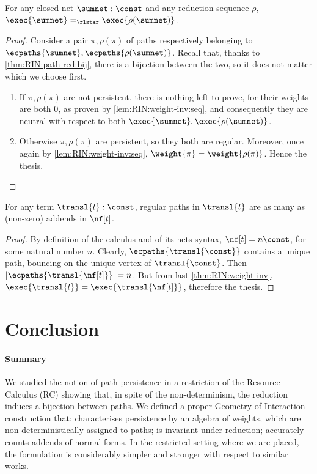 \begin{theorem}
\label{thm:RIN:weight-inv}
For any closed net $\sumnet: \const$ and any reduction sequence
$\rho$, $\exec{\sumnet} =_\rlstar \exec{\rho(\sumnet)}$.
\end{theorem}

\begin{proof}
  Consider a pair $\pi,\rho(\pi)$ of paths respectively belonging to 
  $\ecpaths{\sumnet}, \ecpaths{\rho(\sumnet)}$.
  Recall that, thanks to \autoref{thm:RIN:path-red:bij},
  there is a bijection between the two, so it does not matter which we choose 
  first.
  \begin{enumerate}
  \item
    If $\pi,\rho(\pi)$ are not persistent, there is nothing left to prove, 
    for their weights are both $0$, as proven
    by \autoref{lem:RIN:weight-inv:seq},
    and consequently they are neutral with respect to both
    $\exec{\sumnet}, \exec{\rho(\sumnet)}$.
  \item
    Otherwise $\pi,\rho(\pi)$ are persistent,
    so they both are regular.
    Moreover, once again by \autoref{lem:RIN:weight-inv:seq},
    $\weight{\pi} = \weight{\rho(\pi)}$.
    Hence the thesis.
  \end{enumerate}
\vspace{-1.5em}
\end{proof}

\begin{corollary}
\label{cor:RIN:path-red:number}
  For any term $\transl{t}:\const$, regular paths in 
  $\transl{t}$ are as many as (non-zero) addends in $\nf[t]$.
\end{corollary}
\begin{proof}
  By definition of the calculus and of its nets syntax,
  $\nf[t] = n \const$, for some natural number $n$.
  Clearly, $\ecpaths{\transl{\const}}$ contains a unique path, bouncing on the 
  unique vertex of $\transl{\const}$.
  Then $|\ecpaths{\transl{\nf[t]}}| = n$.
  But from last \autoref{thm:RIN:weight-inv},
  $\exec{\transl{t}} = \exec{\transl{\nf[t]}}$,
  therefore the thesis.
\end{proof}

\section*{Conclusion}

\paragraph{Summary}
We studied the notion of path persistence in a restriction of the Resource 
Calculus (RC) showing that, in spite of the non-determinism,
the reduction induces a bijection between paths.
We defined a proper Geometry of Interaction construction that:
characterises persistence by an algebra of weights, which are 
non-deterministically assigned to paths;
is invariant under reduction;
accurately counts addends of normal forms.
In the restricted setting where we are placed, the formulation is 
considerably simpler and stronger with respect to similar works.


